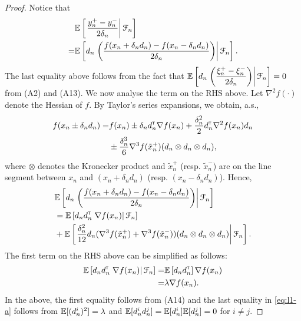 \begin{proof}
Notice that
\begin{align*}
&\mathbb{E}\left[\left.\dfrac{y_n^+ - y_n^-}{2\delta_n} \right| \mathcal{F}_n\right] \\
= & \mathbb{E}\left[d_n\left.\left(\dfrac{f(x_n+\delta_n d_n) - f(x_n-\delta_n d_n)}{2\delta_n}\right) \right| \mathcal{F}_n\right].
\end{align*}
The last equality above follows from the fact that $\mathbb{E}\left[  d_n\left.\left(\dfrac{\xi_n^+ - \xi_n^-}{2\delta_n}\right) \right| \mathcal{F}_n\right]=0$ from (A2) and (A13). We now analyse the term on the RHS above.
Let $\nabla^2 f(\cdot)$ denote the Hessian of $f$.
By Taylor's series expansions, we obtain, a.s.,
\begin{align*}
f(x_n \pm \delta_n d_n) =& f(x_n) \pm \delta_n d_n^\mathsf{\scriptscriptstyle T} \nabla f(x_n) + \frac{\delta_n^2}{2} d_n^\mathsf{\scriptscriptstyle T} \nabla^2 f(x_n) d_n \\
& \pm  \frac{\delta_n^3}{6} \nabla^3 f(\tilde  x_n^+)(d_n \otimes d_n \otimes d_n),
\end{align*}
where $\otimes$ denotes the Kronecker product and $\tilde x_n^+$ (resp. $\tilde x_n^-$) are on the line segment between $x_n$ and $(x_n + \delta_n d_n)$ (resp. $(x_n - \delta_n d_n)$).
Hence,
\begin{align}
&\mathbb{E}\left[d_n\left.\left(\dfrac{f(x_n+\delta_n d_n) - f(x_n-\delta_n d_n)}{2\delta_n}\right)\right| \mathcal{F}_n \right] \nonumber\\
&= \mathbb{E}\left[d_n d_n^\mathsf{\scriptscriptstyle T} \left.\nabla f(x_n)\right| \mathcal{F}_n\right]\nonumber \\
& +   \mathbb{E}\left[\left.\frac{\delta_n^2}{12} d_n (\nabla^3 f(\tilde  x_n^+)+\nabla^3 f(\tilde  x_n^-))(d_n \otimes d_n \otimes d_n)\right| \mathcal{F}_n\right]. \label{eq:l1}
\end{align}
The first term on the RHS above can be simplified as follows:
\begin{align}
\mathbb{E}\left[d_n d_n^\mathsf{\scriptscriptstyle T} \left.\nabla f(x_n)\right| \mathcal{F}_n\right] = &\mathbb{E}\left[d_n d_n^\mathsf{\scriptscriptstyle T} \right] \nabla f(x_n) \nonumber\\
= &  \lambda \nabla f(x_n). \label{eq:l1-a}
\end{align}
In the above, the first equality follows from (A14) and the last equality in \eqref{eq:l1-a} follows from $\mathbb{E}[(d_n^i)^2] = \lambda$ and $\mathbb{E}[d_n^i d_n^j] = \mathbb{E}[d_n^i] \mathbb{E}[d_n^j] = 0$ for $i\ne j$.


\end{proof}
